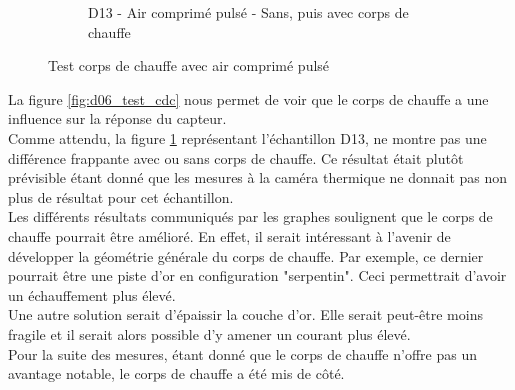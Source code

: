 \begin{figure}[H]
\begin{subfigure}{0.45\textwidth}
        \caption{D13 - Air comprimé pulsé - Sans, puis avec corps de chauffe}
        \label{fig:d13_test_cdc}
    \end{subfigure}
    \caption{Test corps de chauffe avec air comprimé pulsé}
    \label{fig:test_cdc}
\end{figure}

La figure \ref{fig:d06_test_cdc} nous permet de voir que le corps de chauffe a une influence sur la réponse du capteur. \\
Comme attendu, la figure \ref{fig:d13_test_cdc} représentant l'échantillon D13, ne montre pas une différence frappante avec ou sans corps de 
chauffe. Ce résultat était plutôt prévisible étant donné que les mesures à la caméra thermique ne donnait pas non plus de résultat pour cet 
échantillon. \\

Les différents résultats communiqués par les graphes soulignent que le corps de chauffe pourrait être amélioré. En effet, il serait intéressant 
à l'avenir de développer la géométrie générale du corps de chauffe. Par exemple, ce dernier pourrait être une piste d'or en configuration 
"serpentin". Ceci permettrait d'avoir un échauffement plus élevé. \\
Une autre solution serait d'épaissir la couche d'or. Elle serait peut-être moins fragile et il serait alors possible d'y amener un courant plus élevé. \\

Pour la suite des mesures, étant donné que le corps de chauffe n'offre pas un avantage notable, le corps de chauffe a été mis de côté. 

